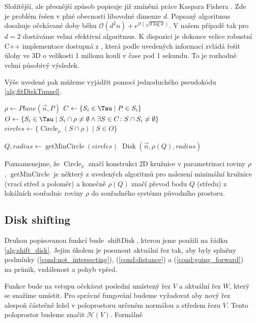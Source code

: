 Složitější, ale přesnější způsob popisuje již zmíněná práce Kaspara Fishera
\cite{FisherBalls}. Zde je problém řešen v plné obecnosti libovolné dimenze $ d $.
Popsaný algoritmus dosahuje očekávané doby běhu
$ \mathcal{O}(d^2n) + e^{\mathcal{O}(\sqrt{d \log{d}})} $. V našem případě tak pro
$ d = 2 $ dostáváme velmi efektivní algoritmus. K dispozici je dokonce velice
robustní C++ implementace dostupná z \cite{cpp_balls}, která podle uvedených informací
zvládá řešit úlohy ve 3D o velikosti 1 milionu koulí v čase pod 1 sekundu. To
je rozhodně velmi působivý výsledek.

Výše uvedené pak můžeme vyjádřit pomocí jednoduchého pseudokódu \ref{alg:fitDiskTunnel}.

\begin{algorithmic}[1]
\label{alg:fitDiskTunnel}

    \State $ \rho \gets Plane(\vec{n}, P) $
    \State $ C \gets \{S_i \in \Tau \mid P \in S_i \} $
    \State $ O \gets \{ S_i \in \Tau
        \mid S_i \cap \rho \neq \emptyset
            \wedge \exists S \in C \colon S \cap S_i \neq \emptyset  \} $
    \State $ circles \gets \{ \operatorname{Circle}_{\rho}(S \cap \rho) \mid S \in O \} $
    \State

    \State $ Q, radius \gets \operatorname{getMinCircle}(circles) $
    \State \Return $ \operatorname{Disk}(\vec{n}, \rho(Q), radius) $
\EndFunction

\end{algorithmic}

Poznamenejme, že $ \operatorname{Circle}_{\rho} $ značí konstrukci 2D kružnice
v parametrizaci roviny $ \rho $, $ \operatorname{getMinCircle} $ je některý z
uvedených algoritmů pro nalezení minimální kružnice (vrací střed a poloměr)
a konečně $ \rho(Q) $ značí převod bodu $ Q $ (středu) z lokálních souřadnic
roviny $ \rho $ do souřadného systému původního prostoru.



\subsection{Disk shifting}
Druhou popisovanou funkcí bude $ \operatorname{shiftDisk} $, kterou jsme použili
na řádku \ref{alg:shift_disk}. Jejím úkolem je posunout aktuální řez tak, aby
byly splněny podmínky (\ref{cond:not_intersecting}), (\ref{cond:distance})
a (\ref{cond:going_forward}) na průnik, vzdálenost a pohyb vpřed.

Funkce bude na vstupu očekávat poslední umístený řez $ V $ a aktuální řez $ W $,
který se snažíme umístit. Pro správné fungování budeme vyžadovat aby nový řez
alespoň částečně ležel v poloprostoru určeném normálou a středem řezu $ V $.
Tento poloprostor budeme značit $ \mathcal{H}(V) $. Formálně


